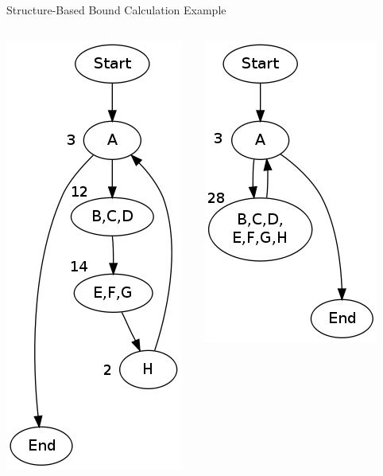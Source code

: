 \documentclass{beamer}
\begin{document}
\begin{frame}{Structure-Based Bound Calculation Example}
\begin{columns}
\begin{column}{0.25\textwidth}
      \includegraphics[scale=0.3]{structureoutput2.png}
    \end{column}
    \begin{column}{0.25\textwidth}
      \includegraphics[scale=0.3]{structureoutput3.png}
    \end{column}
    \begin{column}{0.25\textwidth}

\end{column}
\end{columns}
\end{frame}
\end{document}
